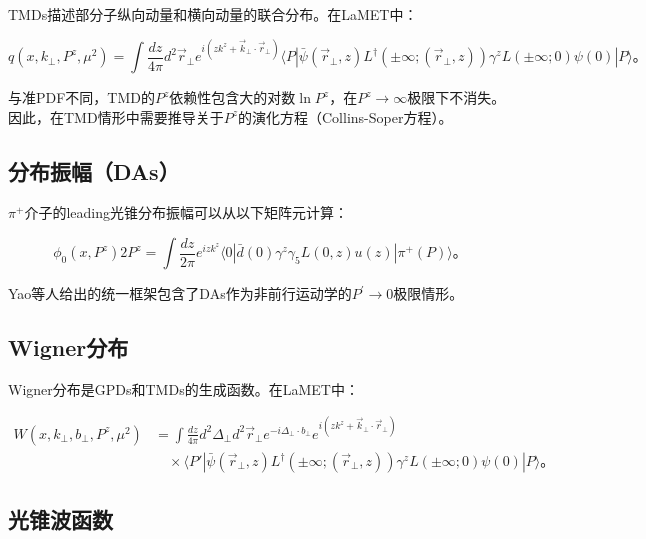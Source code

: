 \documentclass[12pt,a4paper]{ctexart}
\theoremstyle{definition}
\begin{document}
TMDs描述部分子纵向动量和横向动量的联合分布。在LaMET中\cite{Ji2013Euclidean}：

\begin{equation}
q(x, k_\perp, P^z, \mu^2) = \int \frac{dz}{4\pi} d^2\vec{r}_\perp e^{i(zk^z + \vec{k}_\perp\cdot\vec{r}_\perp)} \langle P| \bar{\psi}(\vec{r}_\perp, z) L^\dagger(\pm\infty; (\vec{r}_\perp, z)) \gamma^z L(\pm\infty; 0) \psi(0) |P\rangle。
\label{eq:TMD_quasi}
\end{equation}

与准PDF不同，TMD的$P^z$依赖性包含大的对数$\ln P^z$，在$P^z \to \infty$极限下不消失\cite{Ji2013Euclidean}。因此，在TMD情形中需要推导关于$P^z$的演化方程（Collins-Soper方程）。

\subsection{分布振幅（DAs）}

$\pi^+$介子的leading光锥分布振幅可以从以下矩阵元计算\cite{Ji2013Euclidean}：

\begin{equation}
\phi_0(x, P^z) 2P^z = \int \frac{dz}{2\pi} e^{izk^z} \langle 0| \bar{d}(0) \gamma^z \gamma_5 L(0, z) u(z) |\pi^+(P)\rangle。
\label{eq:DA_quasi}
\end{equation}

Yao等人\cite{Yao2023}给出的统一框架包含了DAs作为非前行运动学的$P^{\prime} \to 0$极限情形。

\subsection{Wigner分布}

Wigner分布是GPDs和TMDs的生成函数。在LaMET中\cite{Ji2013Euclidean}：

\begin{equation}
\begin{aligned}
W(x, k_\perp, b_\perp, P^z, \mu^2) &= \int \frac{dz}{4\pi} d^2\Delta_\perp d^2\vec{r}_\perp e^{-i\Delta_\perp\cdot b_\perp} e^{i(zk^z + \vec{k}_\perp\cdot\vec{r}_\perp)} \\
&\quad \times \langle P'| \bar{\psi}(\vec{r}_\perp, z) L^\dagger(\pm\infty; (\vec{r}_\perp, z)) \gamma^z L(\pm\infty; 0) \psi(0) |P\rangle。
\end{aligned}
\label{eq:Wigner_quasi}
\end{equation}

\subsection{光锥波函数}
\end{document}
